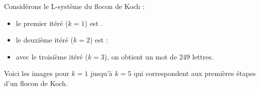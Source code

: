 \documentclass[11pt,class=report,crop=false]{standalone}
\begin{document}
\begin{exemple}
Considérons le L-système du flocon de Koch :
  \begin{itemize}
    \item le premier itéré ($k = 1$) est .
    \item le deuxième itéré ($k = 2$) est  :  
     
    \item avec le troisième itéré ($k = 3$), on obtient  un mot de $249$ lettres.
    
  \end{itemize}
  
 
  Voici les images pour $k=1$ jusqu'à $k=5$ qui correspondent aux premières étapes d'un flocon de Koch.
  

\end{exemple}
\end{document}
